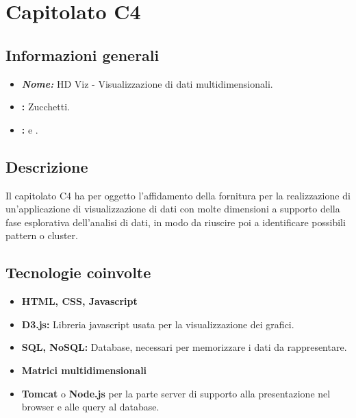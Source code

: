 \section{Capitolato C4}

\subsection{Informazioni generali}
\begin{itemize}
\item \textbf{\emph{Nome:}} HD Viz - Visualizzazione di dati multidimensionali.
\item \textbf{\commitProg:} Zucchetti.
\item \textbf{\proponProg:} \VT{} e \CR.
\end{itemize}

\subsection{Descrizione}
Il capitolato C4 ha per oggetto l’affidamento della fornitura per la realizzazione di un'applicazione di visualizzazione di dati con molte dimensioni a supporto della fase esplorativa dell'analisi di dati, in modo da riuscire poi a identificare possibili pattern o cluster.

\subsection{Tecnologie coinvolte}
\begin{itemize}
\item \textbf{HTML, CSS, Javascript} 
\item \textbf{D3.js:} Libreria javascript usata per la visualizzazione dei grafici.
\item \textbf{SQL, NoSQL:} Database, necessari per memorizzare i dati da rappresentare.
\item \textbf{Matrici multidimensionali}
\item \textbf{Tomcat} o \textbf{Node.js} per la parte server di supporto alla presentazione nel browser e alle query al database.
\end{itemize}

